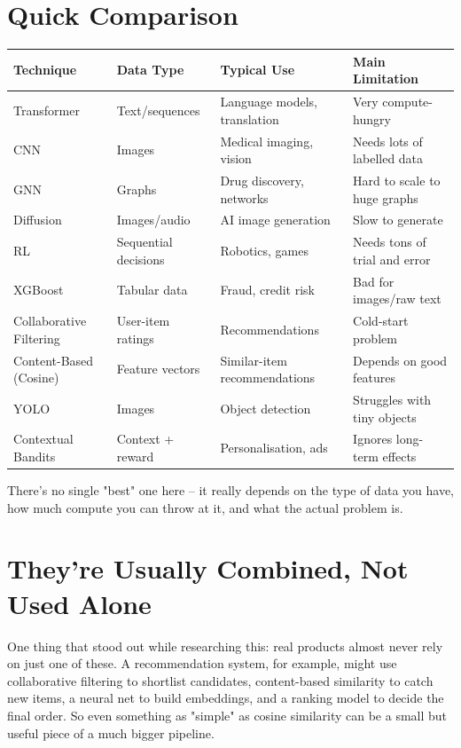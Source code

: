 \documentclass[11pt]{article}
\begin{document}
\section{Quick Comparison}

\begin{table}[H]
\centering
\footnotesize
\setlength{\tabcolsep}{3pt}
\begin{tabular}{p{2.2cm} p{2.6cm} p{4.5cm} p{4.5cm}}
\toprule
\textbf{Technique} & \textbf{Data Type} & \textbf{Typical Use} & \textbf{Main Limitation} \\
\midrule
Transformer & Text/sequences & Language models, translation & Very compute-hungry \\
CNN & Images & Medical imaging, vision & Needs lots of labelled data \\
GNN & Graphs & Drug discovery, networks & Hard to scale to huge graphs \\
Diffusion & Images/audio & AI image generation & Slow to generate \\
RL & Sequential decisions & Robotics, games & Needs tons of trial and error \\
XGBoost & Tabular data & Fraud, credit risk & Bad for images/raw text \\
Collaborative Filtering & User-item ratings & Recommendations & Cold-start problem \\
Content-Based (Cosine) & Feature vectors & Similar-item recommendations & Depends on good features \\
YOLO & Images & Object detection & Struggles with tiny objects \\
Contextual Bandits & Context + reward & Personalisation, ads & Ignores long-term effects \\
\bottomrule
\end{tabular}
\end{table}

There's no single "best" one here -- it really depends on the type of data you have, how much compute you can throw at it, and what the actual problem is.

\section{They're Usually Combined, Not Used Alone}

One thing that stood out while researching this: real products almost never rely on just one of these. A recommendation system, for example, might use collaborative filtering to shortlist candidates, content-based similarity to catch new items, a neural net to build embeddings, and a ranking model to decide the final order. So even something as "simple" as cosine similarity can be a small but useful piece of a much bigger pipeline.
\end{document}
